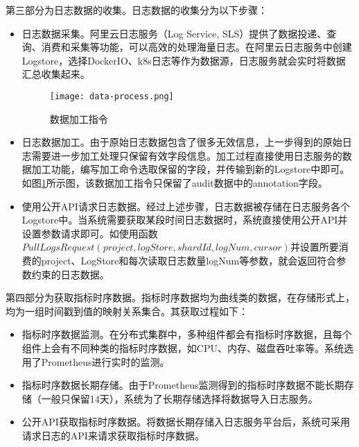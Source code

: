 第三部分为日志数据的收集。日志数据的收集分为以下步骤：
\begin{itemize}
    \item [（1）]日志数据采集。阿里云日志服务（Log Service, SLS）提供了数据投递、查询、消费和采集等功能，可以高效的处理海量日志。在阿里云日志服务中创建Logstore，选择DockerIO、k8s日志等作为数据源，日志服务就会实时将数据汇总收集起来。
    \begin{figure}[htbp]
        \centering
        \texttt{[image: data-process.png]}
        \caption{数据加工指令\label{data-process}}
    \end{figure}
    \item [（2）]日志数据加工。由于原始日志数据包含了很多无效信息，上一步得到的原始日志需要进一步加工处理只保留有效字段信息。加工过程直接使用日志服务的数据加工功能，编写加工命令选取保留的字段，并传输到新的Logstore中即可。如图\ref{data-process}所示图，该数据加工指令只保留了audit数据中的annotation字段。
    \item [（3）]使用公开API请求日志数据。经过上述步骤，日志数据被存储在日志服务各个Logstore中。当系统需要获取某段时间日志数据时，系统直接使用公开API并设置参数请求即可。如使用函数$PullLogsRequest(project, logStore, shardId, logNum, cursor)$并设置所要消费的project、LogStore和每次读取日志数量logNum等参数，就会返回符合参数约束的日志数据。
\end{itemize}

第四部分为获取指标时序数据。指标时序数据均为曲线类的数据，在存储形式上，均为一组时间戳到值的映射关系集合。其获取过程如下：
\begin{itemize}
    \item [（1）]指标时序数据监测。在分布式集群中，多种组件都会有指标时序数据，且每个组件上会有不同种类的指标时序数据，如CPU、内存、磁盘吞吐率等。系统选用了Prometheus进行实时的监测。
    \item [（2）]指标时序数据长期存储。由于Prometheus监测得到的指标时序数据不能长期存储（一般只保留14天），系统为了长期存储选择将数据导入日志服务。
    \item [（3）]公开API获取指标时序数据。将数据长期存储入日志服务平台后，系统可采用请求日志的API来请求获取指标时序数据。
\end{itemize}

